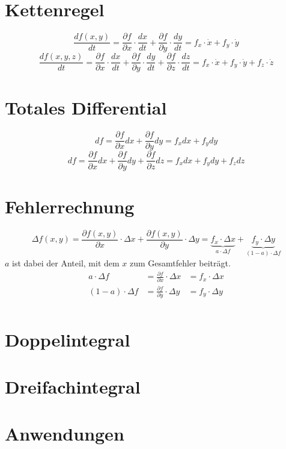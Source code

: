 \section{Kettenregel}
\[ \boxed{\frac{d f(x,y)}{d t} 
= \frac{\partial f}{\partial x} \cdot \frac{d x}{d t} 
+ \frac{\partial f}{\partial y} \cdot \frac{d y}{d t} 
= f_x \cdot \dot{x} + f_y \cdot \dot{y}} \]
\[ \boxed{\frac{d f(x,y,z)}{d t} 
= \frac{\partial f}{\partial x} \cdot \frac{d x}{d t} 
+ \frac{\partial f}{\partial y} \cdot \frac{d y}{d t} 
+ \frac{\partial f}{\partial z} \cdot \frac{d z}{d t} 
= f_x \cdot \dot{x} + f_y \cdot \dot{y} + f_z \cdot \dot{z}} \]

\section{Totales Differential}
\[ \boxed{d f 
= \frac{\partial f}{\partial x} dx + \frac{\partial f}{\partial y} dy 
= f_x dx + f_y dy} \]
\[ \boxed{d f = \frac{\partial f}{\partial x} dx + \frac{\partial f}{\partial y} dy + \frac{\partial f}{\partial z} dz = f_x dx + f_y dy + f_z dz} \]

\section{Fehlerrechnung}
\[ \boxed{\Delta f(x,y) = \frac{\partial f(x,y)}{\partial x} \cdot \Delta x 
+ \frac{\partial f(x,y)}{\partial y} \cdot \Delta y 
= \underbrace{f_x \cdot \Delta x}_{a \cdot \Delta f} 
+ \underbrace{f_y \cdot \Delta y}_{(1 - a) \cdot \Delta f}} \]
$a$ ist dabei der Anteil, mit dem $x$ zum Gesamtfehler beiträgt. 
\[ \boxed{\begin{array}{rll}
a \cdot \Delta f        &= \frac{\partial f}{\partial x} \cdot \Delta x 
&= f_x \cdot \Delta x \\
(1 - a) \cdot \Delta f  &= \frac{\partial f}{\partial y} \cdot \Delta y 
&= f_y \cdot \Delta y \\
\end{array}} \]

\section{Doppelintegral}
\section{Dreifachintegral}
\section{Anwendungen}
